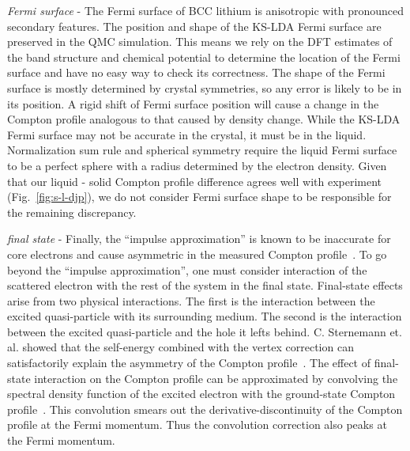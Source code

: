 \documentclass[aps,prb,showpacs,preprintnumbers,amsmath,amssymb,superscriptaddress,twocolumn]{revtex4-1}
\begin{document}
\emph{Fermi surface} - The Fermi surface of BCC lithium is anisotropic with pronounced secondary features. %
The position and shape of the KS-LDA Fermi surface are preserved in the QMC simulation. This means we rely on the DFT estimates of the band structure and chemical potential to determine the location of the Fermi surface and have no easy way to check its correctness.
The shape of the Fermi surface is mostly determined by crystal symmetries, so any error is likely to be in its position. A rigid shift of Fermi surface position will cause a change in the Compton profile analogous to that caused by density change.
While the KS-LDA Fermi surface may not be accurate in the crystal, it must be in the liquid. Normalization sum rule and spherical symmetry require the liquid Fermi surface to be a perfect sphere with a radius determined by the electron density.
Given that our liquid - solid Compton profile difference agrees well with experiment (Fig.~\ref{fig:s-l-djp}), we do not consider Fermi surface shape to be responsible for the remaining discrepancy.

\emph{final state} - Finally, the ``impulse approximation'' is known to be inaccurate for core electrons and cause asymmetric in the measured Compton profile~\cite{Eisenberger1970,Sternemann2000,Huotari2001}. To go beyond the ``impulse approximation'', one must consider interaction of the scattered electron with the rest of the system in the final state. Final-state effects arise from two physical interactions. The first is the interaction between the excited quasi-particle with its surrounding medium. The second is the interaction between the excited quasi-particle and the hole it lefts behind. C. Sternemann et. al. showed that the self-energy combined with the vertex correction can satisfactorily explain the asymmetry of the Compton profile~\cite{Sternemann2000}. The effect of final-state interaction on the Compton profile can be approximated by convolving the spectral density function of the excited electron with the ground-state Compton profile~\cite{Soininen2001}. This convolution smears out the derivative-discontinuity of the Compton profile at the Fermi momentum. Thus the convolution correction also peaks at the Fermi momentum.
\end{document}
